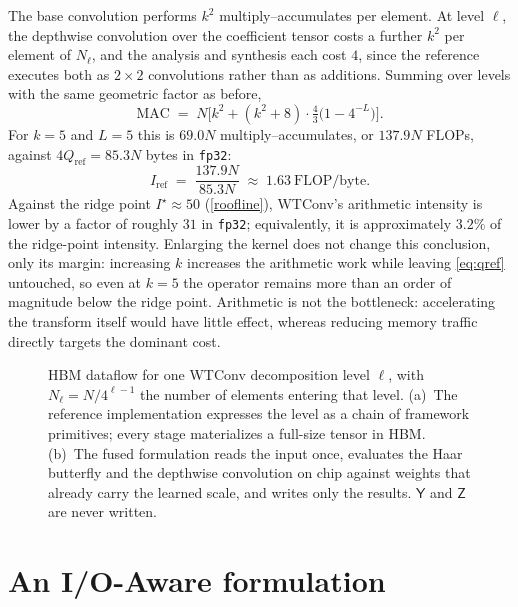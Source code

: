 \documentclass[10pt]{article} %
\newcommand{\tY}{\mathsf{Y}}
\newcommand{\tZ}{\mathsf{Z}}
\newcommand{\Qio}{Q}                    %
\theoremstyle{plain}
\begin{document}
 The base convolution performs $k^2$ multiply--accumulates per element. At level $\ell$, the depthwise convolution over the coefficient tensor costs a further $k^2$ per element of $N_\ell$, and the analysis and synthesis each cost $4$, since the reference executes both as $2\times2$ convolutions rather than as additions. Summing over levels with the same geometric factor as before,
\begin{equation}
\mathrm{MAC} \;=\; N\bigl[k^2 + (k^2+8)\cdot\tfrac43\bigl(1-4^{-L}\bigr)\bigr].
\label{eq:mac}
\end{equation}
For $k=5$ and $L=5$ this is $69.0N$ multiply--accumulates, or $137.9N$ FLOPs, against $4\Qio_{\mathrm{ref}}=85.3N$ bytes in \texttt{fp32}:
\begin{equation}
I_{\mathrm{ref}} \;=\; \frac{137.9N}{85.3N} \;\approx\; 1.63~\text{FLOP/byte}.
\label{eq:intensity}
\end{equation}
 Against the ridge point $I^\star\approx50$ (\autoref{roofline}), WTConv's arithmetic intensity is lower by a factor of roughly $31$ in \texttt{fp32}; equivalently, it is approximately $3.2\%$ of the ridge-point intensity. Enlarging the kernel does not change this conclusion, only its margin: increasing $k$ increases the arithmetic work while leaving \autoref{eq:qref} untouched, so even at $k{=}5$ the operator remains more than an order of magnitude below the ridge point. Arithmetic is not the bottleneck: accelerating the transform itself would have little effect, whereas reducing memory traffic directly targets the dominant cost.



\begin{figure}[t]
\centering

\caption{HBM dataflow for one WTConv decomposition level $\ell$, with $N_\ell = N/4^{\ell-1}$ the number of elements entering that level. (a)~The reference implementation expresses the level as a chain of framework primitives; every stage materializes a full-size tensor in HBM. (b)~The fused formulation reads the input once, evaluates the Haar butterfly and the depthwise convolution on chip against weights that already carry the learned scale, and writes only the results. $\tY$ and $\tZ$ are never written.}
\label{fig:dataflow}
\end{figure}

\section{An I/O-Aware formulation}
\label{sec:method}
\end{document}
